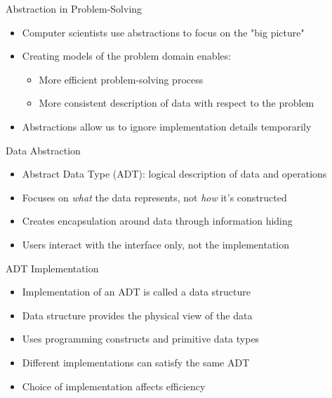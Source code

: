 \documentclass{beamer}
\begin{document}
\begin{frame}{Abstraction in Problem-Solving}
    \begin{itemize}
        \item Computer scientists use abstractions to focus on the "big picture"
        \item Creating models of the problem domain enables:
        \begin{itemize}
            \item More efficient problem-solving process
            \item More consistent description of data with respect to the problem
        \end{itemize}
        \item Abstractions allow us to ignore implementation details temporarily
    \end{itemize}
\end{frame}

\begin{frame}{Data Abstraction}
    \begin{itemize}
        \item Abstract Data Type (ADT): logical description of data and operations
        \item Focuses on \textit{what} the data represents, not \textit{how} it's constructed
        \item Creates encapsulation around data through information hiding
        \item Users interact with the interface only, not the implementation
    \end{itemize}
\end{frame}

\begin{frame}{ADT Implementation}
    \begin{itemize}
        \item Implementation of an ADT is called a data structure
        \item Data structure provides the physical view of the data
        \item Uses programming constructs and primitive data types
        \item Different implementations can satisfy the same ADT
        \item Choice of implementation affects efficiency
    \end{itemize}
\end{frame}
\end{document}

